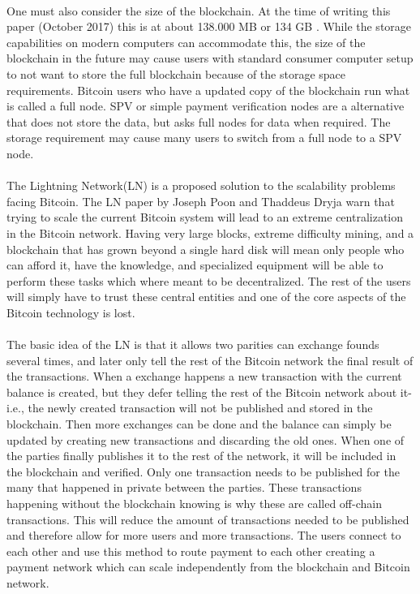 \documentclass[informationsecurity]{gucmasterproject}
\begin{document}
\paragraph{}
One must also consider the size of the blockchain. At the time of writing this paper (October 2017) this is at about 138.000 MB or 134 GB \cite{blockchain_size}. While the storage capabilities on modern computers can accommodate this, the size of the blockchain in the future may cause users with standard consumer computer setup to not want to store the full blockchain because of the storage space requirements. Bitcoin users who have a updated copy of the blockchain run what is called a full node. SPV or simple payment verification nodes are a alternative that does not store the data, but asks full nodes for data when required. The storage requirement may cause many users to switch from a full node to a SPV node. 

\paragraph{}
The Lightning Network(LN) is a proposed solution to the scalability problems facing Bitcoin.
The LN paper by Joseph Poon and Thaddeus Dryja \cite{poon2015bitcoin} warn that trying to scale the current Bitcoin system will lead to an extreme centralization in the Bitcoin network.
Having very large blocks, extreme difficulty mining, and a blockchain that has grown beyond a single hard disk will mean only people who can afford it, have the knowledge, and specialized equipment will be able to perform these tasks which where meant to be decentralized. The rest of the users will simply have to trust these central entities and one of the core aspects of the Bitcoin technology is lost.

\paragraph{}
The basic idea of the LN is that it allows two parities can exchange founds several times, and later only tell the rest of the Bitcoin network the final result of the transactions.
When a exchange happens a new transaction with the current balance is created, but they defer telling the rest of the Bitcoin network about it-i.e., the newly created transaction will not be published and stored in the blockchain. Then more exchanges can be done and the balance can simply be updated by creating new transactions and discarding the old ones.
When one of the parties finally publishes it to the rest of the network, it will be included in the blockchain and verified. Only one transaction needs to be published for the many that happened in private between the parties. These transactions happening without the blockchain knowing is why these are called off-chain transactions. This will reduce the amount of transactions needed to be published and therefore allow for more users and more transactions. The users connect to each other and use this method to route payment to each other creating a payment network which can scale independently from the blockchain and Bitcoin network.
\end{document}
